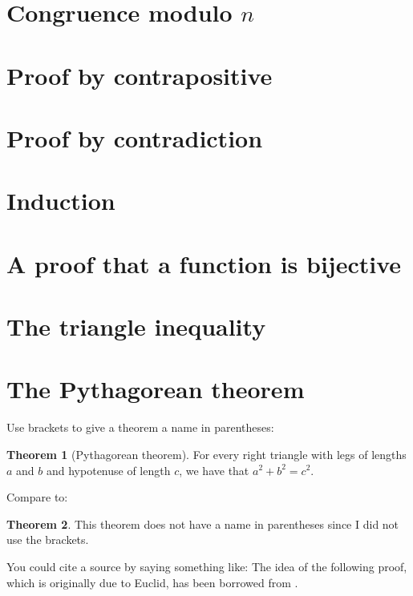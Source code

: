 \documentclass[12pt]{article} %
\theoremstyle{definition}
\newtheorem*{theorem}{Theorem}
\begin{document}
\section{Congruence modulo $n$}


\section{Proof by contrapositive}


\section{Proof by contradiction}


\section{Induction}


\section{A proof that a function is bijective}


\section{The triangle inequality}


\section{The Pythagorean theorem}

Use brackets to give a theorem a name in parentheses:
\begin{theorem}[Pythagorean theorem] 
For every right triangle with legs of lengths $a$ and $b$
		and hypotenuse of length $c$,
		we have that $a^2 + b^2 = c^2$.
\end{theorem}

Compare to:
\begin{theorem}
This theorem does not have a name
in parentheses since I did not use the brackets.
\end{theorem}

You could cite a source by saying something like:
The idea of the following proof, which is originally due to Euclid,
has been borrowed from \cite{pyth}. %
\end{document}
